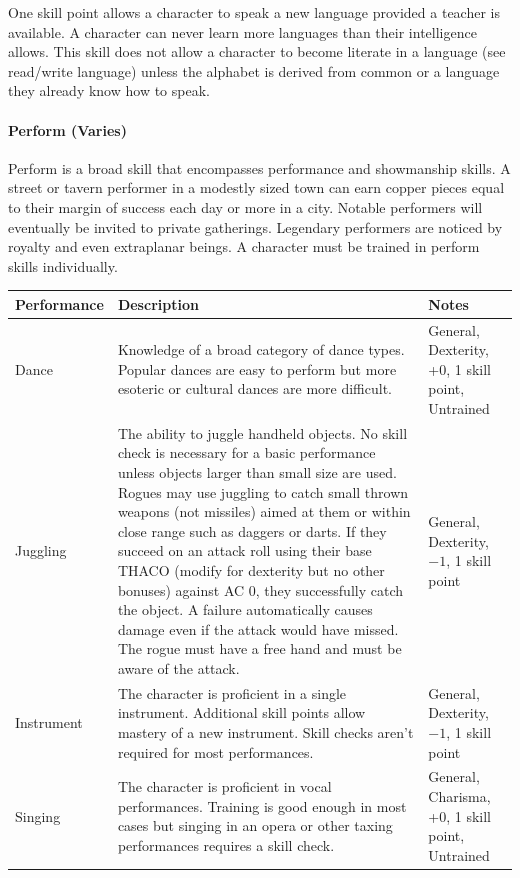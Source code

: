\begin{multicols}{2}
One skill point allows a character to speak a new language provided a teacher is available.  A character can never learn more languages than their intelligence allows.  This skill does not allow a character to become literate in a language (see read/write language) unless the alphabet is derived from common or a language they already know how to speak.

\paragraph{Perform (Varies)}

Perform is a broad skill that encompasses performance and showmanship skills.  A street or tavern performer in a modestly sized town can earn copper pieces equal to their margin of success each day or more in a city.  Notable performers will eventually be invited to private gatherings.  Legendary performers are noticed by royalty and even extraplanar beings.  A character must be trained in perform skills individually.  

\end{multicols}

\noindent
\begin{minipage}{\columnwidth}

\label{performskills}
\noindent
\begin{tabular}{|p{}|p{}|p{}|}
\hline
Performance	& Description	& Notes \\
\hline\hline
\rowcolor[gray]{.9}Dance	& Knowledge of a broad category of dance types.  Popular dances are easy to perform but more esoteric or cultural dances are more difficult.  	& General, Dexterity, +0, 1 skill point, Untrained \\
Juggling	& The ability to juggle handheld objects.  No skill check is necessary for a basic performance unless objects larger than small size are used.  Rogues may use juggling to catch small thrown weapons (not missiles) aimed at them or within close range such as daggers or darts.  If they succeed on an attack roll using their base THACO (modify for dexterity but no other bonuses) against AC 0, they successfully catch the object.  A failure automatically causes damage even if the attack would have missed.  The rogue must have a free hand and must be aware of the attack.  	& General, Dexterity, $-1$, 1 skill point \\
\rowcolor[gray]{.9}Instrument	& The character is proficient in a single instrument.  Additional skill points allow mastery of a new instrument.  Skill checks aren't required for most performances.	& General, Dexterity, $-1$, 1 skill point \\
Singing	& The character is proficient in vocal performances.  Training is good enough in most cases but singing in an opera or other taxing performances requires a skill check.	& General, Charisma, +0, 1 skill point, Untrained \\
\hline
\end{tabular}

\end{minipage}

